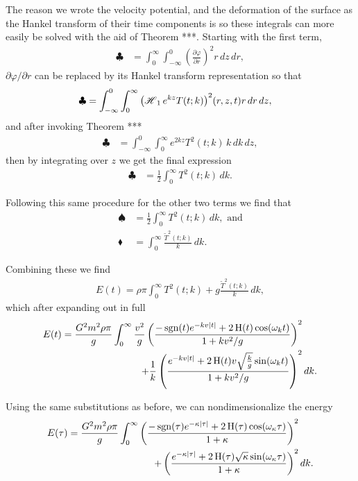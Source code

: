 The reason we wrote the velocity potential, and the deformation of the surface as the Hankel transform of their time components is so these integrals can more easily be solved with the aid of Theorem ***. Starting with the first term,
\begin{align*}
\clubsuit &= \int_0^\infty \int_{-\infty}^0 \left( \frac{\partial \varphi}{\partial r} \right)^2 r \, dz \, dr,
\end{align*}
$\partial \varphi / \partial r$ can be replaced by its Hankel transform representation so that
\begin{align*}
\clubsuit &= \int_{-\infty}^0 \int_0^\infty \Hank[1]{e^{kz}T(t;k)}^2(r,z,t) r \, dr \, dz,
\end{align*}
and after invoking Theorem ***
\begin{align*}
\clubsuit &= \int_{-\infty}^0 \int_0^\infty e^{2kz} T^2(t;k) \, k \, dk \, dz,
\end{align*}
then by integrating over $z$ we get the final expression
\begin{align*}
\clubsuit &= \frac{1}{2} \int_0^\infty T^2(t;k) \, dk.
\end{align*}

Following this same procedure for the other two terms we find that
\begin{align*}
\spadesuit &= \frac{1}{2} \int_0^\infty T^2(t;k) \, dk, \text{ and} \\
\blacklozenge &= \int_0^\infty \frac{\widetilde{T}^2(t;k)}{k} \, dk.
\end{align*}

Combining these we find
\begin{align*}
E(t) = \rho \pi \int_0^\infty T^2(t;k) + g \frac{\widetilde{T}^2(t;k)}{k} \, dk,
\end{align*}
which after expanding out in full
\begin{equation*}
\begin{split}
E(t) = \frac{G^2 m^2 \rho \pi}{g} \int_0^\infty \frac{v^2}{g} \left( \frac{- \sgn(t) e^{-kv |t|} + 2 \Heavi(t) \cos(\omega_k t)}{1+kv^2/g} \right)^2& \\
+ \frac{1}{k} \left( \frac{e^{-kv |t|} + 2 \Heavi(t) v \sqrt{\frac{k}{g}} \sin(\omega_k t)}{1+kv^2/g} \right)^2& \, dk.
\end{split}
\end{equation*}

Using the same substitutions as before, we can nondimensionalize the energy
\begin{equation}
\label{eq:fullenergynon}
\begin{split}
E(\tau) = \frac{G^2 m^2 \rho \pi}{g} \int_0^\infty \left( \frac{- \sgn(\tau) e^{-\kappa |\tau|} + 2 \Heavi(\tau) \cos(\omega_\kappa \tau)}{1+\kappa} \right)^2& \\
+ \left( \frac{e^{-\kappa |\tau|} + 2 \Heavi(\tau) \sqrt{\kappa} \sin(\omega_\kappa \tau)}{1+\kappa} \right)^2& \, dk.
\end{split}
\end{equation}

